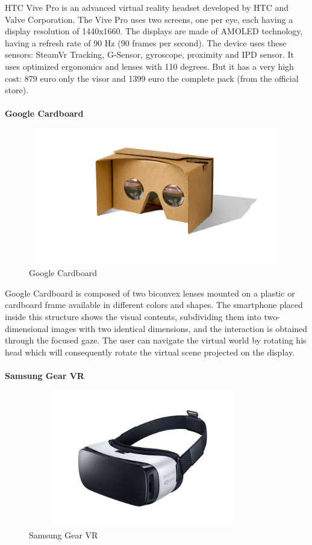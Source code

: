 HTC Vive Pro is an advanced virtual reality headset developed by HTC and Valve Corporation. The Vive Pro uses two screens, one per eye, each having a display resolution of 1440x1660. The displays are made of AMOLED technology, having a refresh rate of 90 Hz (90 frames per second). The device uses these sensors: SteamVr Tracking, G-Sensor, gyroscope, proximity and IPD sensor. It uses optimized ergonomics and lenses with 110 degrees. But it has a very high cost: 879 euro only the visor and 1399 euro the complete pack (from the official store).\\
\\
\textbf{Google Cardboard}
\begin{figure}[H]
\centering
\includegraphics[width=12cm, height=6cm]{immagini/cardboard.png}
\caption{Google Cardboard}\label{fig:cardboard}
\end{figure}
Google Cardboard is composed of two biconvex lenses mounted on a plastic or cardboard frame available in different colors and shapes. The smartphone placed inside this structure shows the visual contents, subdividing them into two-dimensional images with two identical dimensions, and the interaction is obtained through the focused gaze. The user can navigate the virtual world by rotating his head which will consequently rotate the virtual scene projected on the display.\\
\\
\textbf{Samsung Gear VR}
\begin{figure}[H]
\centering
\includegraphics[width=10cm, height=6cm]{immagini/gear.jpg}
\caption{Samsung Gear VR}\label{fig:gearvr}
\end{figure}
